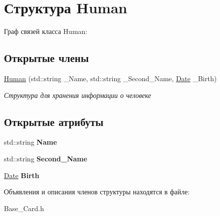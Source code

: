 \hypertarget{structHuman}{}\section{Структура Human}
\label{structHuman}


Граф связей класса Human\+:
\subsection*{Открытые члены}
\begin{DoxyCompactItemize}
\item 
\hyperlink{structHuman_a1a028e8ccc341aa2e552433adf0100fd}{Human} (std\+::string \+\_\+\+Name, std\+::string \+\_\+\+Second\+\_\+\+Name, \hyperlink{structDate}{Date} \+\_\+\+Birth)\hypertarget{structHuman_a1a028e8ccc341aa2e552433adf0100fd}{}\label{structHuman_a1a028e8ccc341aa2e552433adf0100fd}

\begin{DoxyCompactList}\small\item\em Структура для хранения информации о человеке \end{DoxyCompactList}\end{DoxyCompactItemize}
\subsection*{Открытые атрибуты}
\begin{DoxyCompactItemize}
\item 
std\+::string {\bfseries Name}\hypertarget{structHuman_a4804beddf67597d2d5bf6524cc8c61ab}{}\label{structHuman_a4804beddf67597d2d5bf6524cc8c61ab}

\item 
std\+::string {\bfseries Second\+\_\+\+Name}\hypertarget{structHuman_a05c6a99905b67b43af535b137d88e480}{}\label{structHuman_a05c6a99905b67b43af535b137d88e480}

\item 
\hyperlink{structDate}{Date} {\bfseries Birth}\hypertarget{structHuman_addf514ae2df8f2a15aadaa2877d7970b}{}\label{structHuman_addf514ae2df8f2a15aadaa2877d7970b}

\end{DoxyCompactItemize}


Объявления и описания членов структуры находятся в файле\+:\begin{DoxyCompactItemize}
\item 
Base\+\_\+\+Card.\+h\end{DoxyCompactItemize}
